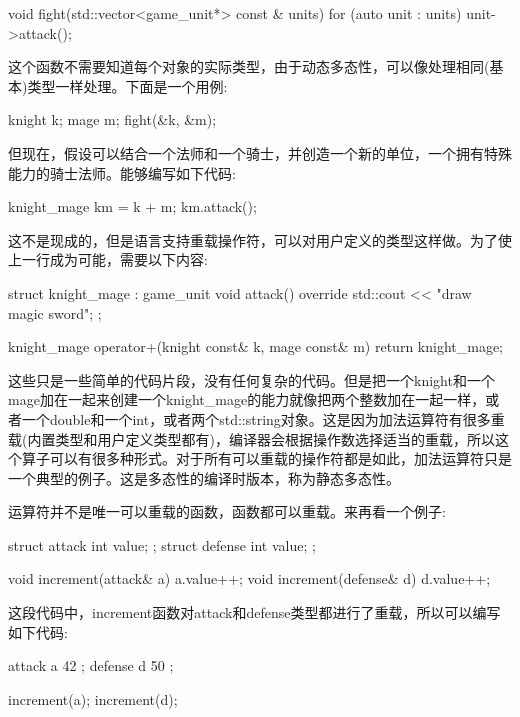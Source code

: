\begin{cpp}
void fight(std::vector<game_unit*> const & units)
{
	for (auto unit : units)
	{
		unit->attack();
	}
}
\end{cpp}

这个函数不需要知道每个对象的实际类型，由于动态多态性，可以像处理相同(基本)类型一样处理。下面是一个用例:

\begin{cpp}
knight k;
mage m;
fight({&k, &m});
\end{cpp}

但现在，假设可以结合一个法师和一个骑士，并创造一个新的单位，一个拥有特殊能力的骑士法师。能够编写如下代码:

\begin{cpp}
knight_mage km = k + m;
km.attack();
\end{cpp}

这不是现成的，但是语言支持重载操作符，可以对用户定义的类型这样做。为了使上一行成为可能，需要以下内容:

\begin{cpp}
struct knight_mage : game_unit
{
	void attack() override
	{ std::cout << "draw magic sword\n"; }
};

knight_mage operator+(knight const& k, mage const& m)
{
	return knight_mage{};
}
\end{cpp}

这些只是一些简单的代码片段，没有任何复杂的代码。但是把一个knight和一个mage加在一起来创建一个knight\_mage的能力就像把两个整数加在一起一样，或者一个double和一个int，或者两个std::string对象。这是因为加法运算符有很多重载(内置类型和用户定义类型都有)，编译器会根据操作数选择适当的重载，所以这个算子可以有很多种形式。对于所有可以重载的操作符都是如此，加法运算符只是一个典型的例子。这是多态性的编译时版本，称为静态多态性。

运算符并不是唯一可以重载的函数，函数都可以重载。来再看一个例子:

\begin{cpp}
struct attack { int value; };
struct defense { int value; };

void increment(attack& a) { a.value++; }
void increment(defense& d) { d.value++; }
\end{cpp}

这段代码中，increment函数对attack和defense类型都进行了重载，所以可以编写如下代码:

\begin{cpp}
attack a{ 42 };
defense d{ 50 };

increment(a);
increment(d);
\end{cpp}

